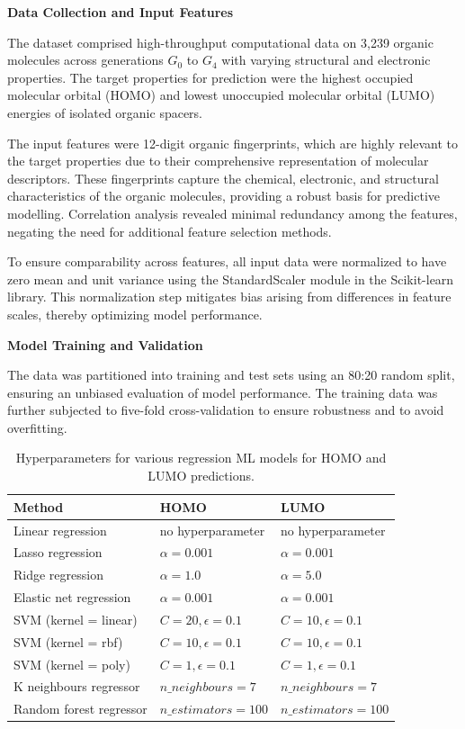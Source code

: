 \textbf{Data Collection and Input Features}

The dataset comprised high-throughput computational data on 3,239 organic molecules across generations $G_0$ to $G_4$ with varying structural and electronic properties. The target properties for prediction were the highest occupied molecular orbital (HOMO) and lowest unoccupied molecular orbital (LUMO) energies of isolated organic spacers.

The input features were 12-digit organic fingerprints, which are highly relevant to the target properties due to their comprehensive representation of molecular descriptors. These fingerprints capture the chemical, electronic, and structural characteristics of the organic molecules, providing a robust basis for predictive modelling. Correlation analysis revealed minimal redundancy among the features, negating the need for additional feature selection methods.

To ensure comparability across features, all input data were normalized to have zero mean and unit variance using the StandardScaler module in the Scikit-learn library. This normalization step mitigates bias arising from differences in feature scales, thereby optimizing model performance.

\textbf{Model Training and Validation}

The data was partitioned into training and test sets using an 80:20 random split, ensuring an unbiased evaluation of model performance. The training data was further subjected to five-fold cross-validation to ensure robustness and to avoid overfitting.

\begin{table}[ht]
\centering
\caption{Hyperparameters for various regression ML models for HOMO and LUMO predictions.}
\begin{tabular}{|l|l|l|}
\hline
\textbf{Method} & \textbf{HOMO} & \textbf{LUMO} \\ \hline
Linear regression & no hyperparameter & no hyperparameter \\ \hline
Lasso regression & $\alpha = 0.001$ & $\alpha = 0.001$ \\ \hline
Ridge regression & $\alpha = 1.0$ & $\alpha = 5.0$ \\ \hline
Elastic net regression & $\alpha = 0.001$ & $\alpha = 0.001$ \\ \hline
SVM (kernel = linear) & $C=20, \epsilon=0.1$ & $C=10, \epsilon=0.1$ \\ \hline
SVM (kernel = rbf) & $C=10, \epsilon=0.1$ & $C=10, \epsilon=0.1$ \\ \hline
SVM (kernel = poly) & $C=1, \epsilon=0.1$ & $C=1, \epsilon=0.1$ \\ \hline
K neighbours regressor & $n\_neighbours=7$ & $n\_neighbours=7$ \\ \hline
Random forest regressor & $n\_estimators=100$ & $n\_estimators=100$ \\ \hline
\end{tabular}

\label{table:table3.3}
\end{table}

